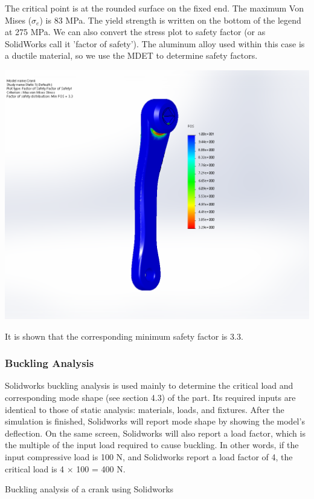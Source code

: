 \documentclass[a4paper,openany,nobib]{tufte-book}
\begin{document}
{{The critical point is at the rounded surface on the fixed end. The
maximum Von Mises (\(\sigma_e\)) is 83 MPa. The yield strength is written
on the bottom of the legend at 275 MPa. We can also convert the stress
plot to safety factor (or as SolidWorks call it 'factor of safety'). The
aluminum alloy used within this case is a ductile material, so we use
the MDET to determine safety factors.


\begin{center}
\includegraphics[width=.9\linewidth]{pictures/Intro-CAD/Crank-safety-factor.png}
\end{center}

It is shown that the corresponding minimum safety factor is 3.3.

\subsubsection{Buckling Analysis}
\label{buckling-analysis}
Solidworks buckling analysis is used mainly to determine the critical
load and corresponding mode shape (see section 4.3) of the part. Its
required inputs are identical to those of static analysis: materials,
loads, and fixtures. After the simulation is finished, Solidworks will
report mode shape by showing the model's deflection. On the same screen,
Solidworks will also report a load factor, which is the multiple of the
input load required to cause buckling. In other words, if the input
compressive load is 100 N, and Solidworks report a load factor of 4, the
critical load is 4 \(\times\) 100 = 400 N.

Buckling analysis of a crank using Solidworks

}}
\end{document}
